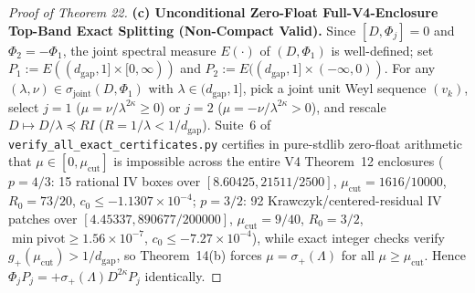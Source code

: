 \documentclass[10pt,letterpaper]{article}
\begin{document}
\begin{proof}[Proof of Theorem 22]
\textbf{(c) Unconditional Zero-Float Full-V4-Enclosure Top-Band Exact Splitting (Non-Compact Valid).}
Since $[D, \Phi_j] = 0$ and $\Phi_2 = -\Phi_1$, the joint spectral measure $E(\cdot)$ of $(D, \Phi_1)$ is well-defined; set $P_1 := E((d_{\mathrm{gap}}, 1]\times[0,\infty))$ and $P_2 := E((d_{\mathrm{gap}}, 1]\times(-\infty,0))$. For any $(\lambda, \nu) \in \sigma_{\mathrm{joint}}(D, \Phi_1)$ with $\lambda \in (d_{\mathrm{gap}}, 1]$, pick a joint unit Weyl sequence $(v_k)$, select $j = 1$ ($\mu = \nu/\lambda^{2\kappa} \ge 0$) or $j = 2$ ($\mu = -\nu/\lambda^{2\kappa} > 0$), and rescale $D \mapsto D/\lambda \preceq R I$ ($R = 1/\lambda < 1/d_{\mathrm{gap}}$). Suite~6 of \texttt{verify\_all\_exact\_certificates.py} certifies in pure-stdlib zero-float arithmetic that $\mu \in [0, \mu_{\mathrm{cut}}]$ is impossible across the entire V4 Theorem~12 enclosures ($p = 4/3$: 15 rational IV boxes over $[8.60425, 21511/2500]$, $\mu_{\mathrm{cut}} = 1616/10000$, $R_0 = 73/20$, $c_0 \le -1.1307\times 10^{-4}$; $p = 3/2$: 92 Krawczyk/centered-residual IV patches over $[4.45337, 890677/200000]$, $\mu_{\mathrm{cut}} = 9/40$, $R_0 = 3/2$, $\min\text{pivot} \ge 1.56\times 10^{-7}$, $c_0 \le -7.27\times 10^{-4}$), while exact integer checks verify $g_+(\mu_{\mathrm{cut}}) > 1/d_{\mathrm{gap}}$, so Theorem~14(b) forces $\mu = \sigma_+(\Lambda)$ for all $\mu \ge \mu_{\mathrm{cut}}$. Hence $\Phi_j P_j = +\sigma_+(\Lambda) D^{2\kappa} P_j$ identically.


\end{proof}
\end{document}
